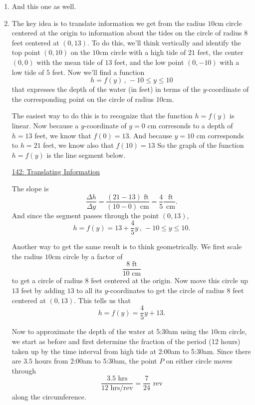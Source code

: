 \documentclass{ximera}
\begin{document}
\begin{example}
\begin{explanation}
\begin{enumerate}
\item And this one as well.

\item The key idea is to translate information we get from the radius $10$cm circle centered at the origin to information about the tides on the circle of radius $8$ feet centered at $(0,13)$. To do this, we'll think vertically and identify the top point $(0,10)$ on the $10$cm circle with a high tide of $21$ feet, the center $(0,0)$ with the mean tide of $13$ feet, and the low point $(0,-10)$ with a low tide of $5$ feet. Now we'll find a function
\[
 h = f(y) \, , \, -10 \leq y \leq 10
\]
that expresses the depth of the water (in feet) in terms of the $y$-coordinate of the corresponding point on the circle of radius $10$cm.

The easiest way to do this is to recognize that the function $h=f(y)$ is linear. Now because a $y$-coordinate of $y=0$ cm corresonds to a depth of $h=13$ feet, we know that $f(0)=13$. And because $y=10$ cm corresponds to $h=21$ feet, we know also that $f(10)=13$ So the graph of the function $h = f(y)$ is the line segment below.

\begin{onlineOnly}
    \begin{center}
\end{center}
\end{onlineOnly}

\href{https://www.desmos.com/calculator/vauspsqfnc}{142: Translating Information}

The slope is 
\[
   \frac{\Delta h}{\Delta y} = \frac{(21-13)\text{ ft}}{(10-0) \text{ cm}} = \frac{4}{5} \frac{\text{ ft}}{\text{ cm}}. 
\]
And since the segment passes through the point $(0,13)$, 
\[
  h = f(y) = 13 + \frac{4}{5}y \, , \, -10 \leq y \leq 10 .
\]

Another way to get the same result is to think geometrically. We first scale the radius $10$cm circle by a factor of 
\[
   \frac{8\text{ ft}}{10\text{ cm}}
\]
to get a circle of radius $8$ feet centered at the origin. Now move this circle up $13$ feet by adding $13$ to all its $y$-coordinates to get the circle of radius $8$ feet centered at $(0,13)$. This tells us that
\[   
    h = f(y) = \frac{4}{5}y + 13.
\]

Now to approximate the depth of the water at 5:30am using the $10$cm circle, we start as before and first determine the fraction of the period (12 hours) taken up by the time interval from high tide at 2:00am to 5:30am. Since there are $3.5$ hours from 2:00am to 5:30am, the point $P$ on either circle moves through 
\[
  \frac{3.5\text{ hrs}}{12 \text{ hrs/rev}} = \frac{7}{24} \text{ rev}
\]
along the circumference.


\end{enumerate}
\end{explanation}
\end{example}
\end{document}
